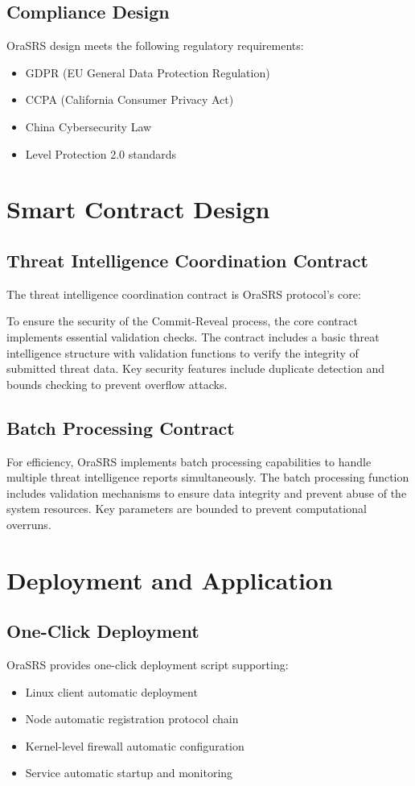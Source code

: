 \documentclass[12pt]{article}
\begin{document}
\subsection{Compliance Design}
OraSRS design meets the following regulatory requirements:
\begin{itemize}
\item GDPR (EU General Data Protection Regulation)
\item CCPA (California Consumer Privacy Act)
\item China Cybersecurity Law
\item Level Protection 2.0 standards
\end{itemize}

\section{Smart Contract Design}

\subsection{Threat Intelligence Coordination Contract}

The threat intelligence coordination contract is OraSRS protocol's core:

To ensure the security of the Commit-Reveal process, the core contract implements essential validation checks. The contract includes a basic threat intelligence structure with validation functions to verify the integrity of submitted threat data. Key security features include duplicate detection and bounds checking to prevent overflow attacks.

\subsection{Batch Processing Contract}

For efficiency, OraSRS implements batch processing capabilities to handle multiple threat intelligence reports simultaneously. The batch processing function includes validation mechanisms to ensure data integrity and prevent abuse of the system resources. Key parameters are bounded to prevent computational overruns.

\section{Deployment and Application}

\subsection{One-Click Deployment}
OraSRS provides one-click deployment script supporting:
\begin{itemize}
\item Linux client automatic deployment
\item Node automatic registration protocol chain
\item Kernel-level firewall automatic configuration
\item Service automatic startup and monitoring
\end{itemize}
\end{document}
